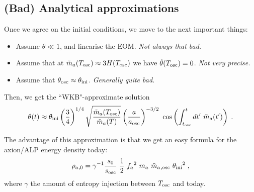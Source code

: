 \documentclass[10pt,utf8,compress,xcolor=dvipsnames]{beamer}
\begin{document}
\subsection{(Bad) Analytical approximations}
\begin{frame}{\insertsubsectionhead}
	Once we agree on the initial conditions, we move to the next important things:\pause
	\begin{itemize}
		\item Assume $\theta \ll 1$, and linearise the EOM. {\sl Not always that bad.}\pause
		\item Assume that at $\tilde m_{a}{}(T_{\rm osc}{}) \approx 3H(T_{\rm osc}{})$ we have $\dot\theta(T_{\rm osc}{})=0$. {\sl Not very precise.}\pause
		\item Assume that $\theta_{\rm osc}{} \approx \theta_{\rm ini}{}$. {\sl Generally quite bad.}\pause
	\end{itemize}
	
	Then, we get the ``WKB"-approximate solution
	\begin{equation*}\vspace*{-0.2cm}
		\theta(t) \approx \thetai \lrb{\dfrac{3}{4}}^{1/4} \sqrt{ \dfrac{ \maT(\Tosc) }{\maT(T)} } \lrb{\dfrac{a}{\aosc}}^{-3/2} \  \cos\lrb{ \int_{\tosc}^t d t^\prime  \ \maT(t^\prime)}   \;.
	\end{equation*}
	
	The advantage of this approximation is that we get an easy formula for the axion/ALP energy density today:
	\begin{equation*}\vspace*{-0.2cm}		
		\rho_{a,0} = \gamma^{-1}  \dfrac{s_0}{s_{\rm osc}} \  \dfrac{1 }{2}  \ \fa^2 \ \ma \ \maT_{,{\rm osc}} \ \thetai^2    \;,
	\end{equation*}
	where $\gamma$ the amount of entropy injection between $T_{\rm osc}{}$ and today.%
\end{frame}
\end{document}
